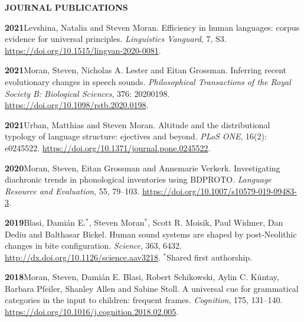 \documentclass[11pt]{article}
\newcommand{\hangpara}{
 \setlength{\parindent}{0in} %
 \hangindent=0.42in %
}
\begin{document}
\clearpage
\begin{flushleft}
{\bf JOURNAL PUBLICATIONS}
\end{flushleft}


\hangpara
{\bf 2021}\hspace{1ex}Levshina, Natalia and Steven Moran. Efficiency in human languages: corpus evidence for universal principles. \textit{Linguistics Vanguard}, 7, S3. \url{https://doi.org/10.1515/lingvan-2020-0081}.

\hangpara
\vskip 6pt
{\bf 2021}\hspace{1ex}Moran, Steven, Nicholas A. Lester and Eitan Grossman. Inferring recent evolutionary changes in speech sounds. \textit{Philosophical Transactions of the Royal Society B: Biological Sciences}, 376: 20200198. \url{https://doi.org/10.1098/rstb.2020.0198}.

\hangpara
\vskip 6pt
{\bf 2021}\hspace{1ex}Urban, Matthias and Steven Moran. Altitude and the distributional typology of language structure: ejectives and beyond. \textit{PLoS ONE}, 16(2): e0245522. \url{https://doi.org/10.1371/journal.pone.0245522}.

\hangpara
\vskip 6pt
{\bf 2020}\hspace{1ex}Moran, Steven, Eitan Grossman and Annemarie Verkerk. Investigating diachronic trends in phonological inventories using BDPROTO. \textit{Language Resource and Evaluation}, 55, 79--103. \url{https://doi.org/10.1007/s10579-019-09483-3}.

\hangpara
\vskip 6pt
{\bf 2019}\hspace{1ex}Blasi, Dami{\'a}n E.$^*$, Steven Moran$^*$, Scott R. Moisik, Paul Widmer, Dan Dediu and Balthasar Bickel. Human sound systems are shaped by post-Neolithic changes in bite configuration. \textit{Science}, 363, 6432. \url{http://dx.doi.org/10.1126/science.aav3218}. $^*$Shared first authorship. %

\hangpara
\vskip 6pt
{\bf 2018}\hspace{1ex}Moran, Steven, Dami{\'a}n E. Blasi, Robert Schikowski, Aylin C. K{\"u}ntay, Barbara Pfeiler, Shanley Allen and Sabine Stoll. A universal cue for grammatical categories in the input to children: frequent frames. \textit{Cognition}, 175, 131--140. \url{https://doi.org/10.1016/j.cognition.2018.02.005}. %
\end{document}
